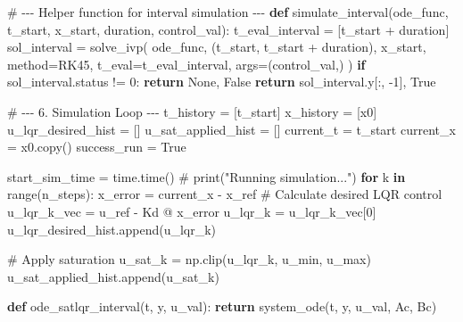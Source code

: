\documentclass[
  letterpaper,
  DIV=11,
  numbers=noendperiod,
  oneside]{scrartcl}
\newenvironment{Shaded}{\begin{snugshade}}{\end{snugshade}}
\newcommand{\BuiltInTok}[1]{\textcolor[rgb]{0.00,0.23,0.31}{#1}}
\newcommand{\CommentTok}[1]{\textcolor[rgb]{0.37,0.37,0.37}{#1}}
\newcommand{\ControlFlowTok}[1]{\textcolor[rgb]{0.00,0.23,0.31}{\textbf{#1}}}
\newcommand{\DecValTok}[1]{\textcolor[rgb]{0.68,0.00,0.00}{#1}}
\newcommand{\KeywordTok}[1]{\textcolor[rgb]{0.00,0.23,0.31}{\textbf{#1}}}
\newcommand{\NormalTok}[1]{\textcolor[rgb]{0.00,0.23,0.31}{#1}}
\newcommand{\OperatorTok}[1]{\textcolor[rgb]{0.37,0.37,0.37}{#1}}
\newcommand{\StringTok}[1]{\textcolor[rgb]{0.13,0.47,0.30}{#1}}
\newcommand{\VariableTok}[1]{\textcolor[rgb]{0.07,0.07,0.07}{#1}}
\begin{document}
\begin{Shaded}
\begin{Highlighting}[numbers=left,,]
\CommentTok{\# {-}{-}{-} Helper function for interval simulation {-}{-}{-}}
\KeywordTok{def}\NormalTok{ simulate\_interval(ode\_func, t\_start, x\_start, duration, control\_val):}
\NormalTok{    t\_eval\_interval }\OperatorTok{=}\NormalTok{ [t\_start }\OperatorTok{+}\NormalTok{ duration]}
\NormalTok{    sol\_interval }\OperatorTok{=}\NormalTok{ solve\_ivp(}
\NormalTok{        ode\_func, (t\_start, t\_start }\OperatorTok{+}\NormalTok{ duration), x\_start, method}\OperatorTok{=}\StringTok{\textquotesingle{}RK45\textquotesingle{}}\NormalTok{,}
\NormalTok{        t\_eval}\OperatorTok{=}\NormalTok{t\_eval\_interval, args}\OperatorTok{=}\NormalTok{(control\_val,)}
\NormalTok{    )}
    \ControlFlowTok{if}\NormalTok{ sol\_interval.status }\OperatorTok{!=} \DecValTok{0}\NormalTok{: }\ControlFlowTok{return} \VariableTok{None}\NormalTok{, }\VariableTok{False}
    \ControlFlowTok{return}\NormalTok{ sol\_interval.y[:, }\OperatorTok{{-}}\DecValTok{1}\NormalTok{], }\VariableTok{True}

\CommentTok{\# {-}{-}{-} 6. Simulation Loop {-}{-}{-}}
\NormalTok{t\_history }\OperatorTok{=}\NormalTok{ [t\_start]}
\NormalTok{x\_history }\OperatorTok{=}\NormalTok{ [x0]}
\NormalTok{u\_lqr\_desired\_hist }\OperatorTok{=}\NormalTok{ []}
\NormalTok{u\_sat\_applied\_hist }\OperatorTok{=}\NormalTok{ []}
\NormalTok{current\_t }\OperatorTok{=}\NormalTok{ t\_start}
\NormalTok{current\_x }\OperatorTok{=}\NormalTok{ x0.copy()}
\NormalTok{success\_run }\OperatorTok{=} \VariableTok{True}

\NormalTok{start\_sim\_time }\OperatorTok{=}\NormalTok{ time.time()}
\CommentTok{\# print("Running simulation...")}
\ControlFlowTok{for}\NormalTok{ k }\KeywordTok{in} \BuiltInTok{range}\NormalTok{(n\_steps):}
\NormalTok{    x\_error }\OperatorTok{=}\NormalTok{ current\_x }\OperatorTok{{-}}\NormalTok{ x\_ref}
    \CommentTok{\# Calculate desired LQR control}
\NormalTok{    u\_lqr\_k\_vec }\OperatorTok{=}\NormalTok{ u\_ref }\OperatorTok{{-}}\NormalTok{ Kd }\OperatorTok{@}\NormalTok{ x\_error}
\NormalTok{    u\_lqr\_k }\OperatorTok{=}\NormalTok{ u\_lqr\_k\_vec[}\DecValTok{0}\NormalTok{]}
\NormalTok{    u\_lqr\_desired\_hist.append(u\_lqr\_k)}

    \CommentTok{\# Apply saturation}
\NormalTok{    u\_sat\_k }\OperatorTok{=}\NormalTok{ np.clip(u\_lqr\_k, u\_min, u\_max)}
\NormalTok{    u\_sat\_applied\_hist.append(u\_sat\_k)}

    \KeywordTok{def}\NormalTok{ ode\_satlqr\_interval(t, y, u\_val):}
        \ControlFlowTok{return}\NormalTok{ system\_ode(t, y, u\_val, Ac, Bc)}


\end{Highlighting}
\end{Shaded}
\end{document}
